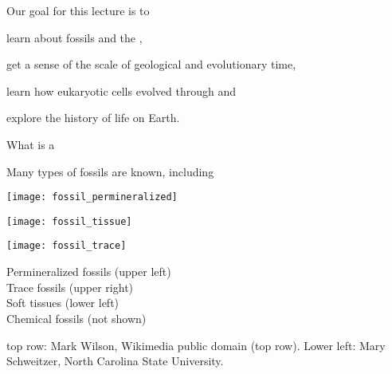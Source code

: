 \documentclass[t]{beamer}
\begin{document}
\begin{frame}{Our goal for this lecture is to}
	
	\hangpara learn about fossils and the ,
	
	\hangpara get a sense of the scale of geological and evolutionary time, 
	
	\hangpara learn how eukaryotic cells evolved through  and

	\hangpara explore the history of life on Earth.
	

\end{frame}
%


\begin{frame}{What is a  }



\end{frame}
%
\begin{frame}[t]{Many types of fossils are known, including}

	\vspace*{-\baselineskip}

	\begin{multicols}{2}

		\texttt{[image: fossil\_permineralized]}\vspace*{\baselineskip}

		\texttt{[image: fossil\_tissue]}

	\columnbreak

		\texttt{[image: fossil\_trace]}\vspace*{\baselineskip}

		Permineralized fossils (upper left)\\
		Trace fossils (upper right)\\
		Soft tissues (lower left)\\
		Chemical fossils (not shown)

	\end{multicols}

	\vfilll

	\tiny top row: Mark Wilson, Wikimedia public domain (top row). Lower left: \textcopyright Mary Schweitzer, North Carolina State University.

\end{frame}
\end{document}
